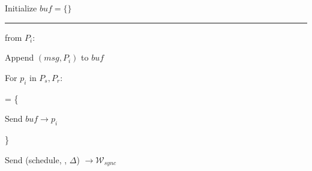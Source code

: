 \begin{bbox}[title={$\F_{\msf{abc}} (C, P_s, P_r, \Delta)$}]

Initialize $buf = \{\}$

\vspace{2mm} \hrule \vspace{2mm}

\OnInput {} from $P_i$:
	\begin{renumerate}
		\item Append $(msg, P_i)$ to $buf$
		\item For $p_i$ in $P_s,P_r$:
		\begin{renumerate}
			\item {} = \{
			
				\quad Send $buf \rightarrow p_i$

			\}
			\item Send (schedule, , $\Delta$) $\rightarrow \mathcal{W}_{sync}$
		\end{renumerate}
	\end{renumerate}
\end{bbox}

